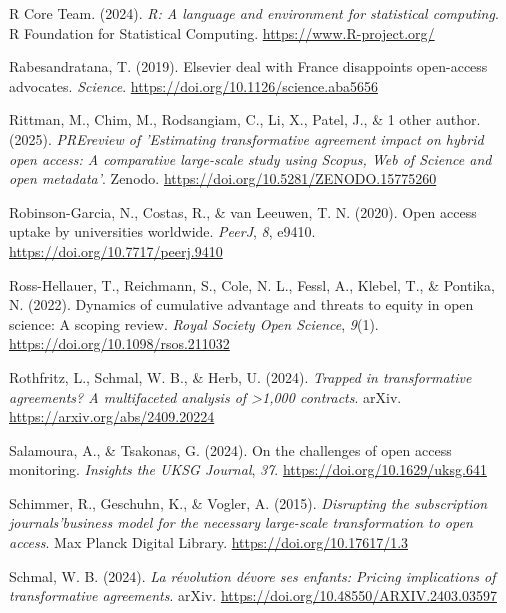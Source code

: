 \documentclass[a4paper,man,floatsintext,longtable,noextraspace,10pt]{apa6}
\newlength{\cslhangindent}
\newenvironment{CSLReferences}[2] %
{\begin{list}{}{%
  \setlength{\itemindent}{0pt}
  \setlength{\leftmargin}{0pt}
  \setlength{\parsep}{0pt}
  \ifodd #1
  \setlength{\leftmargin}{\cslhangindent}
  \setlength{\itemindent}{-1\cslhangindent}
  \fi
  \setlength{\itemsep}{#2\baselineskip}}}
{\end{list}}
\begin{document}
\begin{CSLReferences}{1}{0}
R Core Team. (2024). \emph{R: A language and environment for statistical
computing}. R Foundation for Statistical Computing.
\url{https://www.R-project.org/}

Rabesandratana, T. (2019). Elsevier deal with {France} disappoints
open-access advocates. \emph{Science}.
\url{https://doi.org/10.1126/science.aba5656}

Rittman, M., Chim, M., Rodsangiam, C., Li, X., Patel, J., \& 1 other
author. (2025). \emph{PREreview of '{Estimating} transformative
agreement impact on hybrid open access: A comparative large-scale study
using {Scopus}, {Web of Science} and open metadata'}. Zenodo.
\url{https://doi.org/10.5281/ZENODO.15775260}

Robinson-Garcia, N., Costas, R., \& van Leeuwen, T. N. (2020). Open
access uptake by universities worldwide. \emph{{PeerJ}}, \emph{8},
e9410. \url{https://doi.org/10.7717/peerj.9410}

Ross-Hellauer, T., Reichmann, S., Cole, N. L., Fessl, A., Klebel, T., \&
Pontika, N. (2022). Dynamics of cumulative advantage and threats to
equity in open science: A scoping review. \emph{Royal Society Open
Science}, \emph{9}(1). \url{https://doi.org/10.1098/rsos.211032}

Rothfritz, L., Schmal, W. B., \& Herb, U. (2024). \emph{Trapped in
transformative agreements? A multifaceted analysis of \textgreater1,000
contracts}. arXiv. \url{https://arxiv.org/abs/2409.20224}

Salamoura, A., \& Tsakonas, G. (2024). On the challenges of open access
monitoring. \emph{Insights the UKSG Journal}, \emph{37}.
\url{https://doi.org/10.1629/uksg.641}

Schimmer, R., Geschuhn, K., \& Vogler, A. (2015). \emph{{Disrupting the
subscription journals'business model for the necessary large-scale
transformation to open access}}. Max Planck Digital Library.
\url{https://doi.org/10.17617/1.3}

Schmal, W. B. (2024). \emph{La révolution dévore ses enfants: Pricing
implications of transformative agreements}. arXiv.
\url{https://doi.org/10.48550/ARXIV.2403.03597}


\end{CSLReferences}
\end{document}
